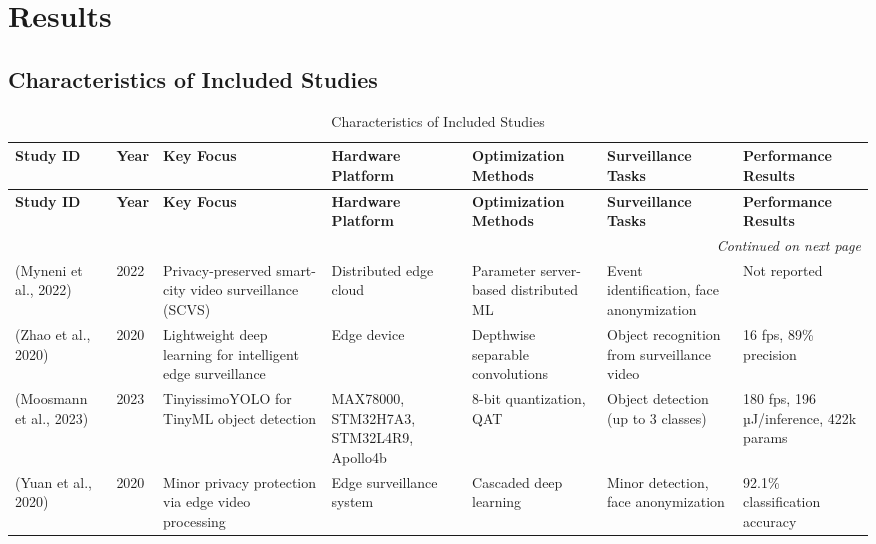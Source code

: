 \documentclass[12pt, a4paper]{article}
\begin{document}
\section{Results}
\subsection{Characteristics of Included Studies}

\begin{landscape}
\footnotesize
\begin{longtable}{ p{3.5cm} p{0.8cm} p{3.5cm} p{3cm} p{3.5cm} p{3.5cm} p{3.5cm} }
\caption{Characteristics of Included Studies} \label{tab:characteristics} \\
\toprule
\textbf{Study ID} & \textbf{Year} & \textbf{Key Focus} & \textbf{Hardware Platform} & \textbf{Optimization Methods} & \textbf{Surveillance Tasks} & \textbf{Performance Results} \\
\midrule
\endfirsthead
\toprule
\textbf{Study ID} & \textbf{Year} & \textbf{Key Focus} & \textbf{Hardware Platform} & \textbf{Optimization Methods} & \textbf{Surveillance Tasks} & \textbf{Performance Results} \\
\midrule
\endhead
\midrule
\multicolumn{7}{r}{\textit{Continued on next page}} \\
\endfoot
\bottomrule
\endlastfoot

(Myneni et al., 2022) \cite{myneni2022} & 2022 & Privacy-preserved smart-city video surveillance (SCVS) & Distributed edge cloud & Parameter server-based distributed ML & Event identification, face anonymization & Not reported \\

(Zhao et al., 2020) \cite{zhao2020} & 2020 & Lightweight deep learning for intelligent edge surveillance & Edge device & Depthwise separable convolutions & Object recognition from surveillance video & 16 fps, 89\% precision \\

(Moosmann et al., 2023) \cite{moosmann2023} & 2023 & TinyissimoYOLO for TinyML object detection & MAX78000, STM32H7A3, STM32L4R9, Apollo4b & 8-bit quantization, QAT & Object detection (up to 3 classes) & 180 fps, 196 µJ/inference, 422k params \\

(Yuan et al., 2020) \cite{yuan2020} & 2020 & Minor privacy protection via edge video processing & Edge surveillance system & Cascaded deep learning & Minor detection, face anonymization & 92.1\% classification accuracy \\


\end{longtable}
\end{landscape}
\end{document}
